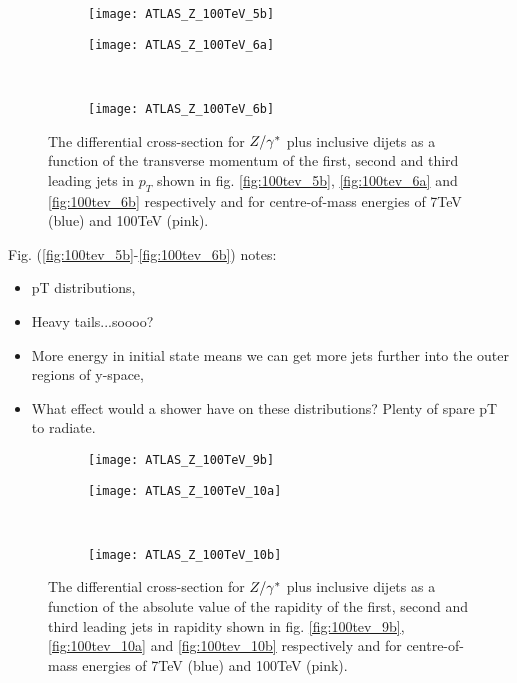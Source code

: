 	\begin{figure}[bth]
		\centering
		\begin{subfigure}[b]{0.48\textwidth}
			\texttt{[image: ATLAS\_Z\_100TeV\_5b]}
			\caption{}
			\label{fig:100tev_5b}
		\end{subfigure}

		\begin{subfigure}[b]{0.48\textwidth}
			\texttt{[image: ATLAS\_Z\_100TeV\_6a]}
			\caption{}
			\label{fig:100tev_6a}
		\end{subfigure}
		~
		\begin{subfigure}[b]{0.48\textwidth}
			\texttt{[image: ATLAS\_Z\_100TeV\_6b]}
			\caption{}
			\label{fig:100tev_6b}
		\end{subfigure}
		\caption{The differential cross-section for $Z/\gamma^*$ plus inclusive dijets as a function of the transverse momentum
		         of the first, second and third leading jets in $p_T$ shown in fig. \eqref{fig:100tev_5b}, \eqref{fig:100tev_6a}
		         and \eqref{fig:100tev_6b} respectively and for centre-of-mass energies of 7TeV (blue) and 100TeV (pink).}
	\end{figure}

	Fig. (\eqref{fig:100tev_5b}-\eqref{fig:100tev_6b}) notes:

	\begin{itemize}
		\item pT distributions,
		\item Heavy tails...soooo?
		\item More energy in initial state means we can get more jets further into the outer regions of y-space,
		\item What effect would a shower have on these distributions?  Plenty of spare pT to radiate.
	\end{itemize}

	\begin{figure}[bth]
		\centering
		\begin{subfigure}[b]{0.48\textwidth}
			\texttt{[image: ATLAS\_Z\_100TeV\_9b]}
			\caption{}
			\label{fig:100tev_9b}
		\end{subfigure}

		\begin{subfigure}[b]{0.48\textwidth}
			\texttt{[image: ATLAS\_Z\_100TeV\_10a]}
			\caption{}
			\label{fig:100tev_10a}
		\end{subfigure}
		~
		\begin{subfigure}[b]{0.48\textwidth}
			\texttt{[image: ATLAS\_Z\_100TeV\_10b]}
			\caption{}
			\label{fig:100tev_10b}
		\end{subfigure}
		\caption{The differential cross-section for $Z/\gamma^*$ plus inclusive dijets as a function of the absolute value of the rapidity
		         of the first, second and third leading jets in rapidity shown in fig. \eqref{fig:100tev_9b}, \eqref{fig:100tev_10a}
		         and \eqref{fig:100tev_10b} respectively and for centre-of-mass energies of 7TeV (blue) and 100TeV (pink).}
	\end{figure}

